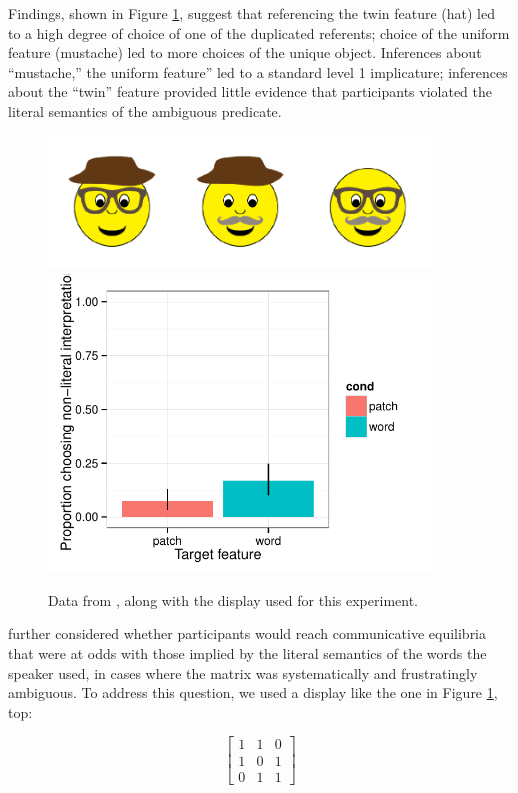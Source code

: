 Findings, shown in Figure \ref{fig:levels-oddman}, suggest that referencing the twin feature ({\sc hat}) led to a high degree of choice of one of the duplicated referents; choice of the uniform feature ({\sc mustache}) led to more choices of the unique object. Inferences about ``mustache,'' the uniform feature'' led to a standard level 1 implicature; inferences about the ``twin'' feature provided little evidence that participants violated the literal semantics of the ambiguous predicate. 

 \begin{figure}[t]
  \centering
  \includegraphics[width=4in]{figures/levels-oddman-stim.pdf}
  \includegraphics[width=4in]{../plots/3-levels-oddman.pdf}

  \caption{\label{fig:levels-oddman} Data from , along with the display used for this experiment.}
\end{figure}

 further considered whether participants would reach communicative equilibria that were at odds with those implied by the literal semantics of the words the speaker used, in cases where the matrix was systematically and frustratingly ambiguous. To address this question, we used a display like the one in Figure \ref{fig:levels-oddman}, top:

\begin{equation}
\left[
    \begin{array}{ccc}
      1 & 1 & 0 \\
      1 & 0 & 1\\
      0 & 1 & 1 
    \end{array} 
  \right]
\end{equation}

